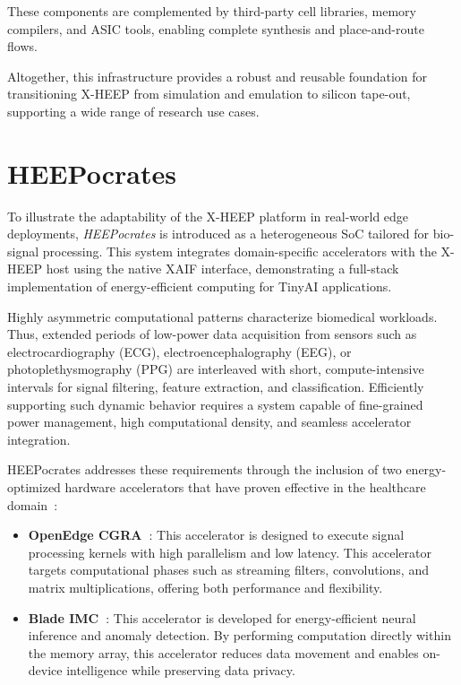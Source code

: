             These components are complemented by third-party cell libraries, memory compilers, and ASIC tools, enabling complete synthesis and place-and-route flows.
            
            Altogether, this infrastructure provides a robust and reusable foundation for transitioning \mbox{X-HEEP} from simulation and emulation to silicon tape-out, supporting a wide range of research use cases.

    \section{HEEPocrates}
    \label{sec:heepocrates}
            
        To illustrate the adaptability of the \mbox{X-HEEP} platform in real-world edge deployments, \emph{HEEPocrates} is introduced as a heterogeneous SoC tailored for bio-signal processing. This system integrates domain-specific accelerators with the \mbox{X-HEEP} host using the native XAIF interface, demonstrating a full-stack implementation of energy-efficient computing for TinyAI applications.
        
        Highly asymmetric computational patterns characterize biomedical workloads. Thus, extended periods of low-power data acquisition from sensors such as electrocardiography (ECG), electroencephalography (EEG), or photoplethysmography (PPG) are interleaved with short, compute-intensive intervals for signal filtering, feature extraction, and classification. Efficiently supporting such dynamic behavior requires a system capable of fine-grained power management, high computational density, and seamless accelerator integration.
        
        \mbox{HEEPocrates} addresses these requirements through the inclusion of two energy-optimized hardware accelerators that have proven effective in the healthcare domain~\cite{bio_apps, co-design_vision}:

        \vspace{-1em}
        \begin{itemize}
            \item \textbf{OpenEdge CGRA~\cite{oe-cgra}}: This accelerator is designed to execute signal processing kernels with high parallelism and low latency. This accelerator targets computational phases such as streaming filters, convolutions, and matrix multiplications, offering both performance and flexibility.
        
            \item \textbf{Blade IMC~\cite{blade}}: This accelerator is developed for energy-efficient neural inference and anomaly detection. By performing computation directly within the memory array, this accelerator reduces data movement and enables on-device intelligence while preserving data privacy.
        \end{itemize}
        \vspace{-1em}
        
